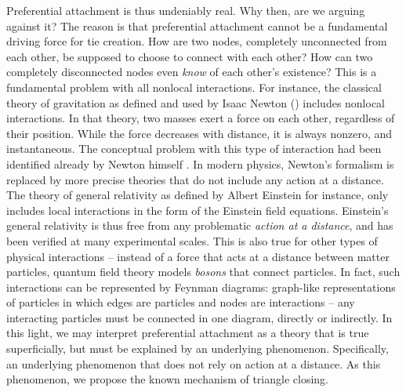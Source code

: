 \documentclass{jimis-final-en}
\begin{document}
Preferential attachment is thus undeniably real.  Why then, are we
arguing against it?
The reason is that preferential attachment cannot be a fundamental
driving force for tie creation. 
How are two nodes, completely unconnected from each
other, be supposed to choose to connect with each other?  How can two
completely disconnected nodes even \emph{know} of each other's existence?
This is a fundamental problem with all nonlocal interactions.  For
instance, the classical theory of gravitation as defined and used by
Isaac Newton (\citeyear{newton}) includes nonlocal interactions.  In that
theory, two masses exert a force on each other, regardless of their
position.  While the force decreases with distance, it is always
nonzero, and instantaneous.  The conceptual problem with this type of
interaction had been identified already by Newton himself
\citep{hesse}.  In modern physics, Newton's formalism is replaced by more
precise theories that do not include any action at a distance.  The
theory of general relativity as defined by Albert Einstein  \citeyearpar{einstein} for
instance, only includes local interactions in the form of the Einstein
field equations.  Einstein's general relativity is
thus free from any problematic \emph{action at a distance}, and has been
verified at many experimental scales.  This is also true for
other types of physical interactions -- instead of a force that acts at
a distance between matter particles, quantum field theory models
\emph{bosons} that connect 
particles.  In fact, such interactions can be represented by Feynman
diagrams: graph-like representations of particles in which edges are
particles and nodes are interactions -- any interacting particles must
be connected in one diagram, directly or indirectly.  In this light, we
may interpret preferential attachment as a theory that is true
superficially, but must be explained by an underlying phenomenon.
Specifically, an underlying phenomenon that does not rely on action at a
distance.  As this phenomenon, we propose the known mechanism of
triangle closing.
\end{document}
